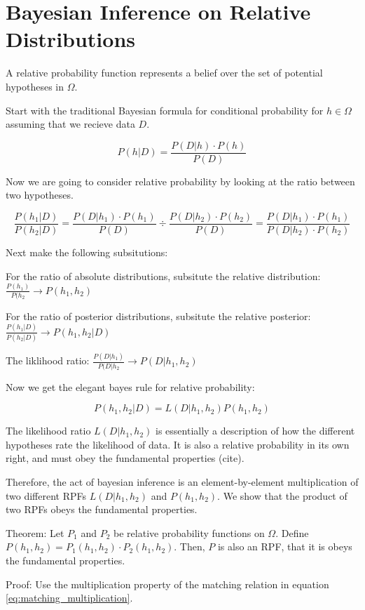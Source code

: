 \documentclass[twoside]{article}
\begin{document}
\section{Bayesian Inference on Relative Distributions}

A relative probability function represents a belief over the set of potential hypotheses in \(\Omega\).

Start with the traditional Bayesian formula for conditional probability for \(h \in \Omega\) assuming that we recieve data \(D\).

\[P(h|D) = \frac{P(D|h) \cdot P(h)}{P(D)}\]

Now we are going to consider relative probability by looking at the ratio between two hypotheses.

\[\frac{P(h_1|D)}{P(h_2| D)} = \frac{P(D|h_1) \cdot P(h_1)}{P(D)} \div \frac{P(D|h_2) \cdot P(h_2)}{P(D)} = \frac{P(D|h_1) \cdot P(h_1)}{P(D|h_2) \cdot P(h_2)} \]

Next make the following subsitutions:

For the ratio of absolute distributions, subsitute the relative distribution: \(\frac{P(h_1)}{P(h_2} \rightarrow P(h_1, h_2) \)

For the ratio of posterior distributions, subsitute the relative posterior: \(\frac{P(h_1|D)}{P(h_2|D)} \rightarrow P(h_1, h_2|D) \)

The liklihood ratio: \(\frac{P(D|h_1)}{P(D|h_2} \rightarrow P(D|h_1, h_2) \)

Now we get the elegant bayes rule for relative probability:

 \[P(h_1, h_2|D) = L(D|h_1, h_2) P(h_1, h_2)\]
 
 The likelihood ratio \(L(D|h_1, h_2)\) is essentially a description of how the different hypotheses rate the likelihood of data. It is also a relative probability in its own right, and must obey the fundamental properties (cite).
 
 Therefore, the act of bayesian inference is an element-by-element multiplication of two different RPFs \(L(D|h_1, h_2)\) and \(P(h_1, h_2)\). We show that the product of two RPFs obeys the fundamental properties.
 
 Theorem: Let \(P_1\) and \(P_2\) be relative probability functions on \(\Omega\). Define \(P(h_1, h_2) = P_1(h_1, h_2) \cdot P_2(h_1, h_2)\). Then, \(P\) is also an RPF, that it is obeys the fundamental properties.
 
 Proof: Use the multiplication property of the matching relation in equation \ref{eq:matching_multiplication}.
 
\end{document}

